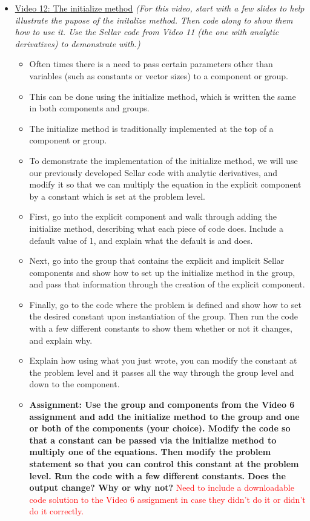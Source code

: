 \documentclass[12pt, letterpaper]{article}
\begin{document}
\begin{itemize}
	\item \underline{Video 12: The initialize method} \textit{(For this video, start with a few slides to help illustrate the pupose of the initalize method. Then code along to show them how to use it. Use the Sellar code from Video 11 (the one with analytic derivatives) to demonstrate with.)}
		\begin{itemize}
			\item Often times there is a need to pass certain parameters other than variables (such as constants or vector sizes) to a component or group.
			\item This can be done using the initialize method, which is written the same in both components and groups.
			\item The initialize method is traditionally implemented at the top of a component or group.
			\item To demonstrate the implementation of the initialize method, we will use our previously developed Sellar code with analytic derivatives, and modify it so that we can multiply the equation in the explicit component by a constant which is set at the problem level. 
			\item First, go into the explicit component and walk through adding the initialize method, describing what each piece of code does. Include a default value of 1, and explain what the default is and does.
			\item Next, go into the group that contains the explicit and implicit Sellar components and show how to set up the initialize method in the group, and pass that information through the creation of the explicit component.
			\item Finally, go to the code where the problem is defined and show how to set the desired constant upon instantiation of the group. Then run the code with a few different constants to show them whether or not it changes, and explain why.
			\item Explain how using what you just wrote, you can modify the constant at the problem level and it passes all the way through the group level and down to the component.
			\item \textbf{Assignment: Use the group and components from the Video 6 assignment and add the initialize method to the group and one or both of the components (your choice). Modify the code so that a constant can be passed via the initialize method to multiply one of the equations. Then modify the problem statement so that you can control this constant at the problem level. Run the code with a few different constants. Does the output change? Why or why not?} \textcolor{red}{Need to include a downloadable code solution to the Video 6 assignment in case they didn't do it or didn't do it correctly.}
		\end{itemize}
		

\end{itemize}
\end{document}
